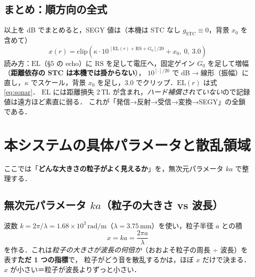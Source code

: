 \documentclass[11pt]{ltjsarticle}
\newcommand{\unit}[1]{\,\mathrm{#1}}
\begin{document}
\subsection{まとめ：順方向の全式}
以上を dB でまとめると，SEGY 値は（本機は STC なし $g_{\mathrm{STC}}\equiv0$，背景 $x_0$ を含めて）
\begin{equation}
\boxed{\;x(r)=\mathrm{clip}\!\left(\kappa\cdot 10^{\,[\mathrm{EL}(r)+\mathrm{RS}+G_0]/20}+x_0,\ 0,\ 3.0\right)\;}
\label{eq:forward}
\end{equation}
読み方：$\mathrm{EL}$（§5 の echo）に $\mathrm{RS}$ を足して電圧へ，固定ゲイン $G_0$ を足して増幅（\textbf{距離依存の STC は本機では掛からない}），
$10^{[\cdot]/20}$ で dB$\to$線形（振幅）に直し，$\kappa$ でスケール，背景 $x_0$ を足し，$3.0$ でクリップ．$\mathrm{EL}(r)$ は式\eqref{eq:sonar}．
$\mathrm{EL}$ には距離損失 $2\,\mathrm{TL}$ が含まれ，\emph{ハード補償されていない}ので記録値は遠方ほど素直に弱る．
これが「発信→反射→受信→変換→SEGY」の全鎖である．

\section{本システムの具体パラメータと散乱領域}
\label{sec:params}
ここでは「\textbf{どんな大きさの粒子がよく見えるか}」を，無次元パラメータ $ka$ で整理する．

\subsection{無次元パラメータ $ka$（粒子の大きさ vs 波長）}
波数 $k=2\pi/\lambda=1.68\times10^{3}\unit{rad/m}$（$\lambda=3.75\unit{mm}$）を使い，粒子半径 $a$ との積
\begin{equation}
x=ka=\frac{2\pi a}{\lambda}
\end{equation}
を作る．これは\emph{粒子の大きさが波長の何倍か}（おおよそ粒子の周長 ÷ 波長）を表す\textbf{ただ 1 つの指標}で，
粒子がどう音を散乱するかは，ほぼ $x$ だけで決まる．$x$ が小さい＝粒子が波長よりずっと小さい．
\end{document}

